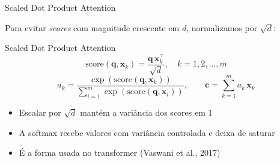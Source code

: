 \documentclass[aspectratio=169,xcolor=dvipsnames]{beamer}
\begin{document}
\begin{frame}{Scaled Dot Product Attention}

Para evitar \textit{scores} com magnitude crescente em $d$, normalizamos por $\sqrt{d}$:

\vspace{6pt}

\begin{exampleblock}{Scaled Dot Product Attention}
\[
\mathrm{score}(\mathbf{q}, \mathbf{x}_k) = \frac{\mathbf{q}\,\mathbf{x}_k^{\top}}{\sqrt{d}}, \quad k = 1, 2, \dots, m
\]
\[
a_k = \frac{\exp(\mathrm{score}(\mathbf{q}, \mathbf{x}_k))}{\sum_{i=1}^{m} \exp(\mathrm{score}(\mathbf{q}, \mathbf{x}_i))}, \qquad
\mathbf{c} = \sum_{k=1}^{m} a_k \, \mathbf{x}_k
\]
\end{exampleblock}

\vspace{6pt}

\begin{itemize}
    \item Escalar por $\sqrt{d}$ mantém a variância dos scores em $1$
    \item A softmax recebe valores com variância controlada e deixa de saturar
    \item É a forma usada no transformer (Vaswani et al., 2017)
\end{itemize}

\end{frame}

\end{document}
